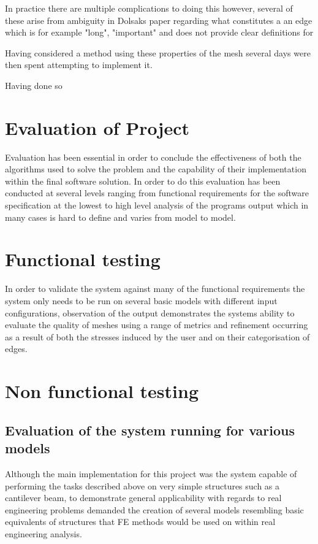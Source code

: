 \documentclass{article}
\begin{document}
\noindent
In practice there are multiple complications to doing this however, several of these arise from ambiguity in Dolsaks paper regarding what constitutes a an edge which is for example "long", "important" and  does not provide clear definitions for 


Having considered a method using these properties of the mesh several days were then spent attempting to implement it.

Having done so 



\section{Evaluation of Project}
Evaluation has been essential in order to conclude the effectiveness of both the algorithms used to solve the problem and the capability of their implementation within the final software solution. In order to do this evaluation has been conducted at several levels ranging from functional requirements for the software specification at the lowest to high level analysis of the programs output which in many cases is hard to define and varies from model to model.

\section{Functional testing}
In order to validate the system against many of the functional requirements the system only needs to be run on several basic models with different input configurations, observation of the output demonstrates the systems ability to evaluate the quality of meshes using a range of metrics and refinement occurring as a result of both the stresses induced by the user and on their categorisation of edges. 

\section{Non functional testing}



\subsection{Evaluation of the system running for various models}
Although the main implementation for this project was the system capable of performing the tasks described above on very simple structures such as a cantilever beam, to demonstrate general applicability with regards to real engineering problems demanded the creation of several models resembling basic equivalents of structures that FE methods would be used on within real engineering analysis.
\end{document}
